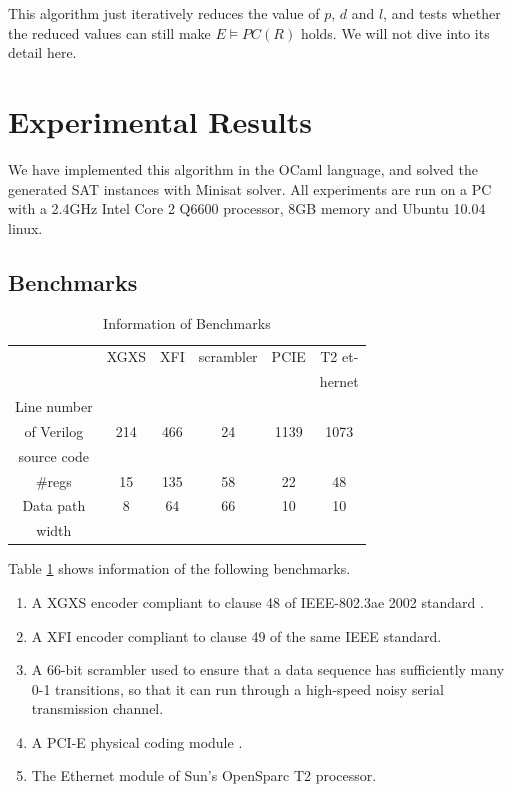 \documentclass{sig-alternate}
\begin{document}
This algorithm just iteratively reduces the value of $p$, $d$ and $l$,
and tests whether the reduced values can still make $E\vDash PC(R)$ holds.
We will not dive into its detail here.


\section{Experimental Results}\label{sec_exp}
We have implemented this algorithm in the OCaml language,
and solved the generated SAT instances with Minisat solver\cite{EXTSAT}.
All experiments are run on a PC with a 2.4GHz Intel Core 2 Q6600 processor, 8GB memory and Ubuntu 10.04 linux.
\subsection{Benchmarks}

\begin{table}[b]
\centering
\caption{Information of Benchmarks}
\begin{tabular}{|c|c|c|c|c|c|}
\hline
&XGXS&XFI&scrambler&PCIE&T2 et-\\
&&&&&hernet\\\hline
Line number&&&&&\\
of Verilog&214&466&24&1139&1073\\
source code&&&&&\\\hline
\#regs&15&135&58&22&48\\\hline
Data path&8&64&66&10&10\\
width&&&&&\\ \hline
\end{tabular}\label{tab_benchmark}
\end{table}




Table \ref{tab_benchmark} shows information of the following benchmarks.
\begin{enumerate}

\item A XGXS encoder compliant to clause 48 of IEEE-802.3ae 2002 standard \cite{IEEE80232002}.

\item A XFI encoder compliant to clause 49 of the same IEEE standard.

\item A 66-bit scrambler used to ensure
that a data sequence has sufficiently many 0-1 transitions,
so that it can run through a high-speed
noisy serial transmission channel.

\item A PCI-E physical coding module \cite{PCIESPEC}.

\item The Ethernet module of Sun's OpenSparc T2 processor.
\end{enumerate}
\end{document}
